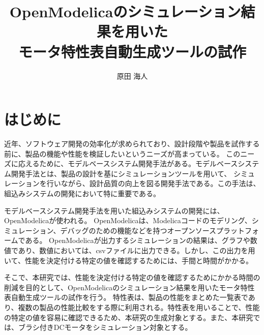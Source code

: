 \documentclass[uplatex, 10pt, a4p]{jsarticle}
\title{OpenModelicaのシミュレーション結果を用いた\\
モータ特性表自動生成ツールの試作}
\author{原田 海人}
\begin{document}
\maketitle


\section{はじめに}
近年、ソフトウェア開発の効率化が求められており、設計段階や製品を試作する前に、製品の機能や性能を検証したいというニーズが高まっている\cite{modelicaモデルベース本}。
このニーズに応えるために、モデルベースシステム開発手法がある\cite{modelicaモデルベース本}。モデルベースシステム開発手法とは、製品の設計を基にシミュレーションツールを用いて、
シミュレーションを行いながら、設計品質の向上を図る開発手法である\cite{ipa_2016}。この手法は、組込みシステムの開発において特に重要である\cite{ipa_useful_modelbase_dev}。

モデルベースシステム開発手法を用いた組込みシステムの開発には、OpenModelica\cite{open_modelica}が使われる。
OpenModelicaは、Modelica\cite{modelicaモデルベース本}コードのモデリング、シミュレーション、デバッグのための機能などを持つオープンソースプラットフォームである。
OpenModelicaが出力するシミュレーションの結果は、グラフや数値であり、数値においては、csvファイルに出力できる。しかし、この出力を用いて、性能を決定付ける特定の値を確認するためには、手間と時間がかかる。

そこで、本研究では、性能を決定付ける特定の値を確認するためにかかる時間の削減を目的として、OpenModelicaのシミュレーション結果を用いたモータ特性表自動生成ツールの試作を行う。
特性表は、製品の性能をまとめた一覧表であり、複数の製品の性能比較をする際に利用される\cite{特性表1,特性表2,特性表3}。特性表を用いることで、性能の特定の値を容易に確認できるため、本研究の生成対象とする。また、本研究では、ブラシ付きDCモータ\cite{モータ使う}をシミュレーション対象とする。
\end{document}
